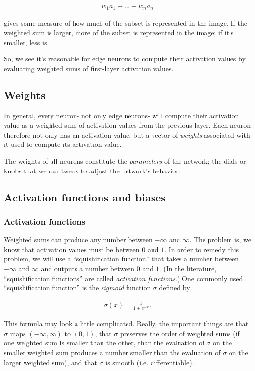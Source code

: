 \documentclass{article}
\begin{document}
	\begin{align*}
		w_1 a_1 + ... + w_n a_n
	\end{align*}
	
	gives some measure of how much of the subset is represented in the image. If the weighted sum is larger, more of the subset is represented in the image; if it's smaller, less is.
	
	So, we see it's reasonable for edge neurons to compute their activation values by evaluating weighted sums of first-layer activation values.
	
	\subsection*{Weights}
	
	In general, every neuron- not only edge neurons- will compute their activation value as a weighted sum of activation values from the previous layer. Each neuron therefore not only has an activation value, but a vector of \textit{weights} associated with it used to compute its activation value.
	
	The weights of all neurons constitute the  \textit{parameters} of the network; the dials or knobs that we can tweak to adjust the network's behavior.
	
	\subsection*{Activation functions and biases}
	
	\subsubsection*{Activation functions}
	
	Weighted sums can produce any number between $-\infty$ and $\infty$. The problem is, we know that activation values must be between $0$ and $1$. In order to remedy this problem, we will use a ``squishification function'' that takes a number between $-\infty$ and $\infty$ and outputs a number between $0$ and $1$. (In the literature, ``squishification functions'' are called \textit{activation functions}.) One commonly used ``squishification function'' is the \textit{sigmoid} function $\sigma$ defined by
	
	\begin{align*}
		\sigma(x) = \frac{1}{1 + e^{-x}}.
	\end{align*}
	
	This formula may look a little complicated. Really, the important things are that $\sigma$ maps $(-\infty, \infty)$ to $(0, 1)$, that $\sigma$ preserves the order of weighted sums (if one weighted sum is smaller than the other, than the evaluation of $\sigma$ on the smaller weighted sum produces a number smaller than the evaluation of $\sigma$ on the larger weighted sum), and that $\sigma$ is smooth (i.e. differentiable).
	
\end{document}
